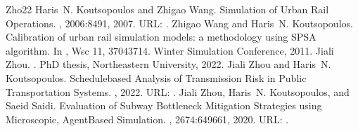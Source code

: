 \documentclass[letterpaper,10pt,english]{sphinxmanual}
\begin{document}
\begin{sphinxthebibliography}{Zho22}
\sphinxAtStartPar
Haris N. Koutsopoulos and Zhigao Wang. Simulation of Urban Rail Operations. , 2006:84\textendash{}91, 2007. URL: .
\sphinxAtStartPar
Zhigao Wang and Haris N. Koutsopoulos. Calibration of urban rail simulation models: a methodology using SPSA algorithm. In , Wsc \textquotesingle{}11, 3704\textendash{}3714. Winter Simulation Conference, 2011.
\sphinxAtStartPar
Jiali Zhou. . PhD thesis, Northeastern University, 2022.
\sphinxAtStartPar
Jiali Zhou and Haris N. Koutsopoulos. Schedule\sphinxhyphen{}based Analysis of Transmission Risk in Public Transportation Systems. , 2022. URL: .
\sphinxAtStartPar
Jiali Zhou, Haris N. Koutsopoulos, and Saeid Saidi. Evaluation of Subway Bottleneck Mitigation Strategies using Microscopic, Agent\sphinxhyphen{}Based Simulation. , 2674:649\textendash{}661, 2020. URL: .
\end{sphinxthebibliography}



\renewcommand{\indexname}{Index}
\printindex
\end{document}
